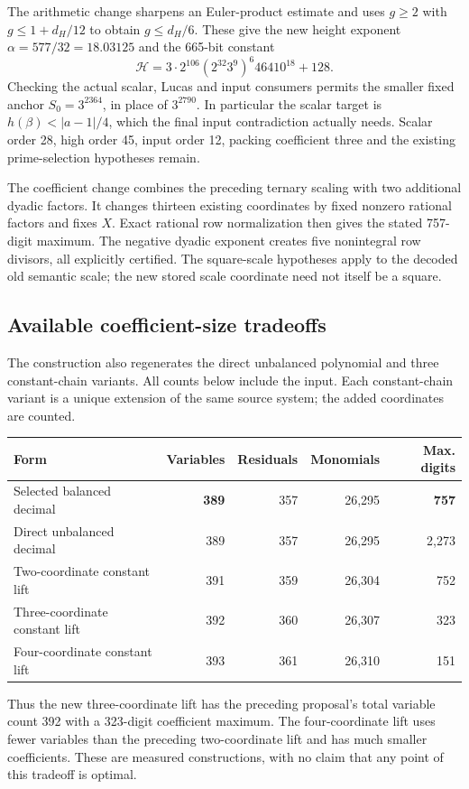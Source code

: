 \documentclass[11pt]{article}
\begin{document}
The arithmetic change sharpens an Euler-product estimate and uses
$g\ge2$ with $g\le1+d_H/12$ to obtain $g\le d_H/6$. These give the
new height exponent $\alpha=577/32=18.03125$ and the 665-bit constant
\[
 \mathcal H=3\cdot2^{106}(2^{32}3^9)^6 46410^{18}+128.
\]
Checking the actual scalar, Lucas and input consumers permits the smaller
fixed anchor $S_0=3^{2364}$, in place of $3^{2790}$. In particular the
scalar target is $h(\beta)<|a-1|/4$, which the final input contradiction
actually needs. Scalar order 28, high order 45, input order 12, packing
coefficient three and the existing prime-selection hypotheses remain.

The coefficient change combines the preceding ternary scaling with two
additional dyadic factors. It changes thirteen existing coordinates by
fixed nonzero rational factors and fixes $X$. Exact rational row
normalization then gives the stated 757-digit maximum. The negative dyadic
exponent creates five nonintegral row divisors, all explicitly certified.
The square-scale hypotheses apply to the decoded old semantic scale;
the new stored scale coordinate need not itself be a square.

\subsection{Available coefficient-size tradeoffs}

The construction also regenerates the direct unbalanced polynomial and
three constant-chain variants. All counts below include the input. Each
constant-chain variant is a unique extension of the same source system;
the added coordinates are counted.
\begin{center}
\begin{tabular}{lrrrr}\toprule
Form & Variables & Residuals & Monomials & Max. digits\\\midrule
Selected balanced decimal &\textbf{389}&357&26,295&\textbf{757}\\
Direct unbalanced decimal &389&357&26,295&2,273\\
Two-coordinate constant lift &391&359&26,304&752\\
Three-coordinate constant lift &392&360&26,307&323\\
Four-coordinate constant lift &393&361&26,310&151\\\bottomrule
\end{tabular}
\end{center}
Thus the new three-coordinate lift has the preceding proposal's total
variable count 392 with a 323-digit coefficient maximum. The four-coordinate
lift uses fewer variables than the preceding two-coordinate lift and has
much smaller coefficients. These are measured constructions, with no
claim that any point of this tradeoff is optimal.
\end{document}
